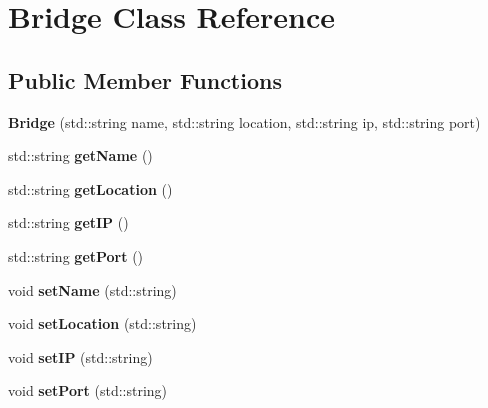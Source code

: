 \hypertarget{class_bridge}{}\section{Bridge Class Reference}
\label{class_bridge}
\subsection*{Public Member Functions}
\begin{DoxyCompactItemize}
\item 
\mbox{\label{class_bridge_ad861a5831395c4960539642a7c8b6d06}} 
{\bfseries Bridge} (std\+::string name, std\+::string location, std\+::string ip, std\+::string port)
\item 
\mbox{\label{class_bridge_ae2f074e1112a9f3f65cc780457ba9c53}} 
std\+::string {\bfseries get\+Name} ()
\item 
\mbox{\label{class_bridge_a9c807b40340f2469ffad6a8e48bfee73}} 
std\+::string {\bfseries get\+Location} ()
\item 
\mbox{\label{class_bridge_afe38bfbf62b3da1b3ea8c42f19c34205}} 
std\+::string {\bfseries get\+IP} ()
\item 
\mbox{\label{class_bridge_a46b6c45282e0a62d98d40116b9fb5510}} 
std\+::string {\bfseries get\+Port} ()
\item 
\mbox{\label{class_bridge_a2eef4d2e75a7d6252199519a6b56146d}} 
void {\bfseries set\+Name} (std\+::string)
\item 
\mbox{\label{class_bridge_a4208cca29d7abedecb1d57a592a9be30}} 
void {\bfseries set\+Location} (std\+::string)
\item 
\mbox{\label{class_bridge_a3d8c86cedec1777b158bc8edccada592}} 
void {\bfseries set\+IP} (std\+::string)
\item 
\mbox{\label{class_bridge_a0552a3f36dd23e8b7e90cf0b5273dadb}} 
void {\bfseries set\+Port} (std\+::string)
\end{DoxyCompactItemize}
